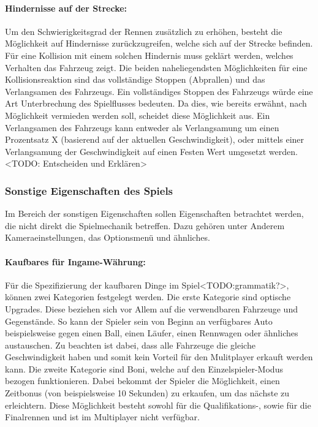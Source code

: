 		\paragraph{Hindernisse auf der Strecke:}
		Um den Schwierigkeitsgrad der Rennen zusätzlich zu erhöhen, besteht die Möglichkeit auf Hindernisse zurückzugreifen, welche sich auf der Strecke befinden. Für eine Kollision mit einem solchen Hindernis muss geklärt werden, welches Verhalten das Fahrzeug zeigt. Die beiden naheliegendsten Möglichkeiten für eine Kollisionsreaktion sind das vollständige Stoppen (Abprallen) und das Verlangsamen des Fahrzeugs.
		Ein vollständiges Stoppen des Fahrzeugs würde eine Art Unterbrechung des Spielflusses bedeuten. Da dies, wie bereits erwähnt, nach Möglichkeit vermieden werden soll, scheidet diese Möglichkeit aus. Ein Verlangsamen des Fahrzeugs kann entweder als Verlangsamung um einen Prozentsatz X (basierend auf der aktuellen Geschwindigkeit), oder mittels einer Verlangsamung der Geschwindigkeit auf einen Festen Wert umgesetzt werden. <TODO: Entscheiden und Erklären>

	\subsubsection{Sonstige Eigenschaften des Spiels}
	Im Bereich der sonstigen Eigenschaften sollen Eigenschaften betrachtet werden, die nicht direkt die Spielmechanik betreffen. Dazu gehören unter Anderem Kameraeinstellungen, das Optionsmenü und ähnliches.

		\paragraph{Kaufbares für Ingame-Währung:}
		Für die Spezifizierung der kaufbaren Dinge im Spiel<TODO:grammatik?>, können zwei Kategorien festgelegt werden. Die erste Kategorie sind optische Upgrades. Diese beziehen sich vor Allem auf die verwendbaren Fahrzeuge und Gegenstände. So kann der Spieler sein von Beginn an verfügbares Auto beispielsweise gegen einen Ball, einen Läufer, einen Rennwagen oder ähnliches austauschen. Zu beachten ist dabei, dass alle Fahrzeuge die gleiche Geschwindigkeit haben und somit kein Vorteil für den Mulitplayer erkauft werden kann. Die zweite Kategorie sind Boni, welche auf den Einzelspieler-Modus bezogen funktionieren. Dabei bekommt der Spieler die Möglichkeit, einen Zeitbonus (von beispielsweise 10 Sekunden) zu erkaufen, um das nächste zu erleichtern. Diese Möglichkeit besteht sowohl für die Qualifikations-, sowie für die Finalrennen und ist im Multiplayer nicht verfügbar.

